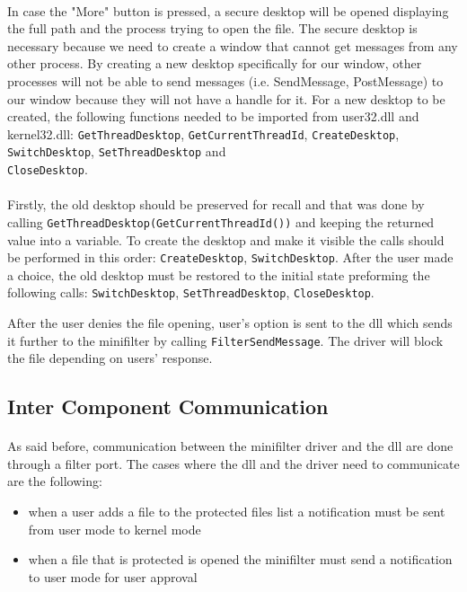 		\paragraph{}
		In case the "More" button is pressed, a secure desktop will be opened displaying the full path and the process trying to open the file. The secure desktop is necessary because we need to create a window that cannot get messages from any other process. By creating a new desktop specifically for our window, other processes will not be able to send messages (i.e. SendMessage, PostMessage) to our window because they will not have a handle for it. For a new desktop to be created, the following functions needed to be imported from user32.dll and kernel32.dll: \texttt{GetThreadDesktop}, \texttt{GetCurrentThreadId}, \texttt{CreateDesktop}, \texttt{SwitchDesktop}, \texttt{SetThreadDesktop} and\\ \texttt{CloseDesktop}. 
		
		\paragraph{}
		Firstly, the old desktop should be preserved for recall and that was done by calling \texttt{GetThreadDesktop(GetCurrentThreadId())} and keeping the returned value into a variable. To create the desktop and make it visible the calls should be performed in this order: \texttt{CreateDesktop}, \texttt{SwitchDesktop}. After the user made a choice, the old desktop must be restored to the initial state preforming the following calls: \texttt{SwitchDesktop}, \texttt{SetThreadDesktop}, \texttt{CloseDesktop}. 
		
		After the user denies the file opening, user's option is sent to the dll which sends it further to the minifilter by calling \texttt{FilterSendMessage}. The driver will block the file depending on users' response. 
	
	
		\subsection{Inter Component Communication}
		\paragraph{}
		As said before, communication between the minifilter driver and the dll are done through a filter port. The cases where the dll and the driver need to communicate are the following:
		\begin{itemize}
			\item when a user adds a file to the protected files list a notification must be sent from user mode to kernel mode
			\item when a file that is protected is opened the minifilter must send a notification to user mode for user approval
		\end{itemize}
			
